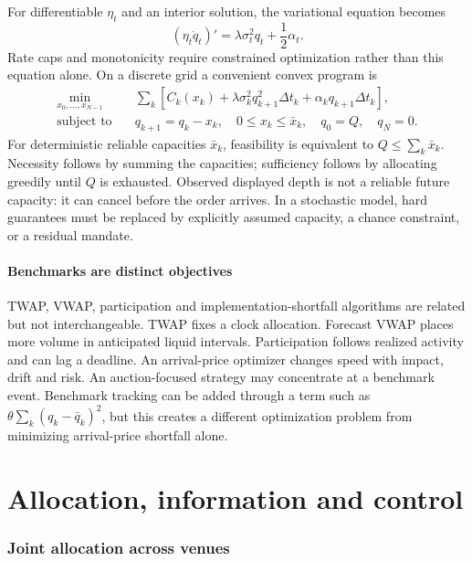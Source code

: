 \documentclass[11pt]{article}
\numberwithin{equation}{section}
\theoremstyle{definition}
\theoremstyle{remark}
\theoremstyle{definition}
\begin{document}
For differentiable $\eta_t$ and an interior solution, the variational equation
becomes
\begin{equation}\label{eq:variable}
 (\eta_t\dot q_t)'=\lambda\sigma_t^2q_t+\frac12\alpha_t.
\end{equation}
Rate caps and monotonicity require constrained optimization rather than this
equation alone. On a discrete grid a convenient convex program is
\begin{align}\label{eq:discschedule}
 \min_{x_0,\ldots,x_{N-1}}\quad &
 \sum_k\left[C_k(x_k)+\lambda\sigma_k^2q_{k+1}^2\Delta t_k
                         +\alpha_kq_{k+1}\Delta t_k\right],\\[-3pt]
 \text{subject to}\quad &q_{k+1}=q_k-x_k,\quad
 0\leq x_k\leq\bar x_k,\quad q_0=Q,\quad q_N=0.\nonumber
\end{align}
For deterministic reliable capacities $\bar x_k$, feasibility is equivalent
to $Q\leq\sum_k\bar x_k$. Necessity follows by summing the capacities;
sufficiency follows by allocating greedily until $Q$ is exhausted.
Observed displayed depth is not a reliable future capacity: it can cancel
before the order arrives. In a stochastic model, hard guarantees must be
replaced by explicitly assumed capacity, a chance constraint, or a residual
mandate.

\subsection{Benchmarks are distinct objectives}

TWAP, VWAP, participation and implementation-shortfall algorithms are related
but not interchangeable. TWAP fixes a clock allocation. Forecast VWAP places
more volume in anticipated liquid intervals. Participation follows realized
activity and can lag a deadline. An arrival-price optimizer changes speed with
impact, drift and risk. An auction-focused strategy may concentrate at a
benchmark event. Benchmark tracking can be added through a term such as
$\theta\sum_k(q_k-\bar q_k)^2$, but this creates a different optimization
problem from minimizing arrival-price shortfall alone.

\part{Allocation, information and control}\label{pt:control}
\section{Joint allocation across venues}\label{sec:routing}
\end{document}

